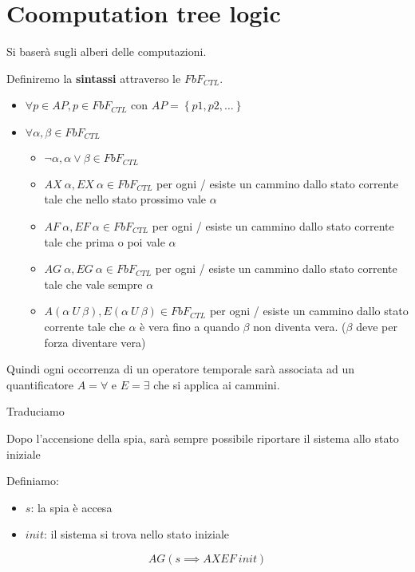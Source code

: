 \section{Coomputation tree logic}
Si baserà sugli alberi delle computazioni.

Definiremo la \textbf{sintassi} attraverso le $FbF_{CTL}$.
\begin{itemize}
    \item $\forall p \in AP, p\in FbF_{CTL}$ con $AP =\left\{p1,p2,\dots\right\}$
    \item $\forall \alpha, \beta \in FbF_{CTL}$
    \begin{itemize}
        \item $\lnot\alpha, \alpha \lor \beta \in FbF_{CTL}$ 
        \item $AX \ \alpha, EX \ \alpha \in FbF_{CTL}$ per ogni / esiste un cammino 
        dallo stato corrente tale che nello stato prossimo vale $\alpha$
        \item $AF \ \alpha, EF \ \alpha \in FbF_{CTL}$ per ogni / esiste un cammino 
        dallo stato corrente tale che prima o poi vale $\alpha$
        \item $AG \ \alpha, EG \ \alpha \in FbF_{CTL}$ per ogni / esiste un cammino 
        dallo stato corrente tale che vale sempre $\alpha$
        \item $A(\alpha \ U \ \beta), E(\alpha \ U \ \beta)\in FbF_{CTL}$ per ogni / esiste 
        un cammino dallo stato corrente tale che $\alpha$ è vera fino a quando $\beta$
        non diventa vera. ($\beta$ deve per forza diventare vera)
    \end{itemize}
\end{itemize}

Quindi ogni occorrenza di un operatore temporale sarà associata ad un quantificatore
$A=\forall$ e $E= \exists$ che si applica ai cammini.

\begin{esempio}
    Traduciamo 
    \begin{center}
        Dopo l'accensione della spia, sarà sempre possibile riportare il sistema 
        allo stato iniziale
    \end{center}
    Definiamo:
    \begin{itemize}
        \item $s$: la spia è accesa
        \item $init$: il sistema si trova nello stato iniziale 
    \end{itemize}
    \begin{equation}
        AG(s\implies AXEF \ init)
    \end{equation}
\end{esempio}

